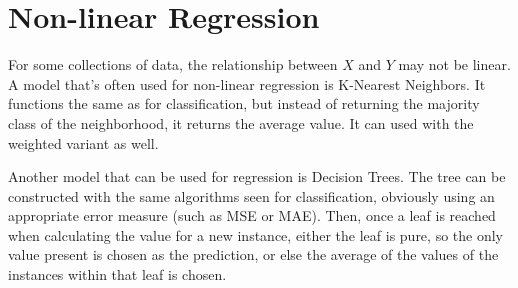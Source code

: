 \section{Non-linear Regression}

For some collections of data, the relationship between $X$ and $Y$ may not be linear. A model that's often used for non-linear regression is K-Nearest Neighbors. It functions the same as for classification, but instead of returning the majority class of the neighborhood, it returns the average value. It can used with the weighted variant as well.

Another model that can be used for regression is Decision Trees. The tree can be constructed with the same algorithms seen for classification, obviously using an appropriate error measure (such as MSE or MAE). Then, once a leaf is reached when calculating the value for a new instance, either the leaf is pure, so the only value present is chosen as the prediction, or else the average of the values of the instances within that leaf is chosen. 